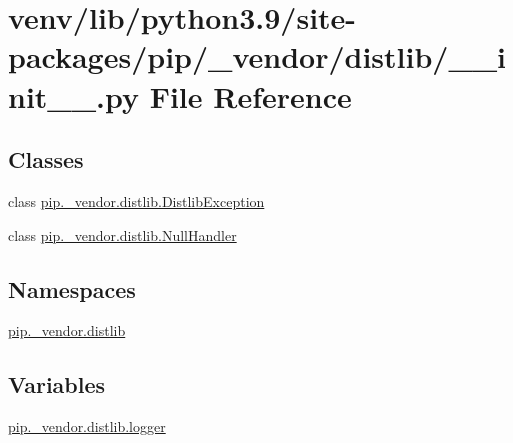 \hypertarget{venv_2lib_2python3_89_2site-packages_2pip_2__vendor_2distlib_2____init_____8py}{}\section{venv/lib/python3.9/site-\/packages/pip/\+\_\+vendor/distlib/\+\_\+\+\_\+init\+\_\+\+\_\+.py File Reference}
\label{venv_2lib_2python3_89_2site-packages_2pip_2__vendor_2distlib_2____init_____8py}
\subsection*{Classes}
\begin{DoxyCompactItemize}
\item 
class \hyperlink{classpip_1_1__vendor_1_1distlib_1_1DistlibException}{pip.\+\_\+vendor.\+distlib.\+Distlib\+Exception}
\item 
class \hyperlink{classpip_1_1__vendor_1_1distlib_1_1NullHandler}{pip.\+\_\+vendor.\+distlib.\+Null\+Handler}
\end{DoxyCompactItemize}
\subsection*{Namespaces}
\begin{DoxyCompactItemize}
\item 
 \hyperlink{namespacepip_1_1__vendor_1_1distlib}{pip.\+\_\+vendor.\+distlib}
\end{DoxyCompactItemize}
\subsection*{Variables}
\begin{DoxyCompactItemize}
\item 
\hyperlink{namespacepip_1_1__vendor_1_1distlib_a125e21a0644bed21ada612dbd41579ce}{pip.\+\_\+vendor.\+distlib.\+logger}
\end{DoxyCompactItemize}
